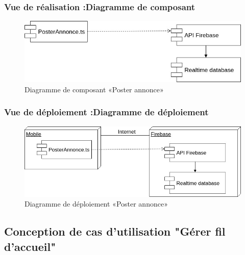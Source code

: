\documentclass[11pt,a4paper,oneside]{book}
\begin{document}
				\subsubsection{Vue de réalisation :Diagramme de composant}
				\begin{figure}[H]
					\centering
					\includegraphics[width=1\textwidth]{Images/ch3/ComposantPosterAnnonce}
					\caption{Diagramme de composant «Poster annonce»}
					\label{fig:composantposterannonce}
				\end{figure}
				\subsubsection{Vue de déploiement :Diagramme de déploiement}
				\begin{figure}[H]
					\centering
					\includegraphics[width=1\textwidth]{Images/ch3/deploimentPosterAnnonce}
					\caption{Diagramme de déploiement «Poster annonce»}
					\label{fig:deploimentposterannonce}
				\end{figure}
				\subsection{Conception de cas d’utilisation "Gérer fil d'accueil"}
\end{document}
